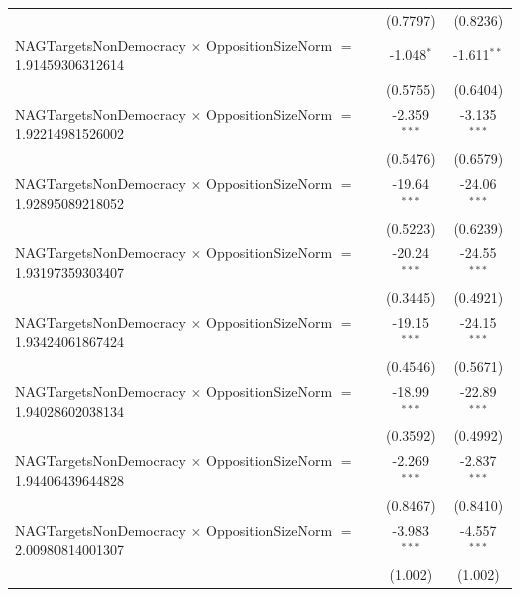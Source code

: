 \begin{tabular}{lcc}
                                                                                & (0.7797)             & (0.8236)\\   
   NAGTargetsNonDemocracy $\times$ OppositionSizeNorm $=$ 1.91459306312614      & -1.048$^{*}$         & -1.611$^{**}$\\   
                                                                                & (0.5755)             & (0.6404)\\   
   NAGTargetsNonDemocracy $\times$ OppositionSizeNorm $=$ 1.92214981526002      & -2.359$^{***}$       & -3.135$^{***}$\\   
                                                                                & (0.5476)             & (0.6579)\\   
   NAGTargetsNonDemocracy $\times$ OppositionSizeNorm $=$ 1.92895089218052      & -19.64$^{***}$       & -24.06$^{***}$\\   
                                                                                & (0.5223)             & (0.6239)\\   
   NAGTargetsNonDemocracy $\times$ OppositionSizeNorm $=$ 1.93197359303407      & -20.24$^{***}$       & -24.55$^{***}$\\   
                                                                                & (0.3445)             & (0.4921)\\   
   NAGTargetsNonDemocracy $\times$ OppositionSizeNorm $=$ 1.93424061867424      & -19.15$^{***}$       & -24.15$^{***}$\\   
                                                                                & (0.4546)             & (0.5671)\\   
   NAGTargetsNonDemocracy $\times$ OppositionSizeNorm $=$ 1.94028602038134      & -18.99$^{***}$       & -22.89$^{***}$\\   
                                                                                & (0.3592)             & (0.4992)\\   
   NAGTargetsNonDemocracy $\times$ OppositionSizeNorm $=$ 1.94406439644828      & -2.269$^{***}$       & -2.837$^{***}$\\   
                                                                                & (0.8467)             & (0.8410)\\   
   NAGTargetsNonDemocracy $\times$ OppositionSizeNorm $=$ 2.00980814001307      & -3.983$^{***}$       & -4.557$^{***}$\\   
                                                                                & (1.002)              & (1.002)\\   

\end{tabular}
